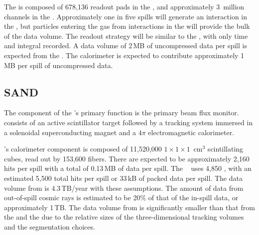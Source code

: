 \documentclass[../main-v1.tex]{subfiles}
\begin{document}
The  is composed of 678,136 readout pads in the , and approximately 3~million channels in the .  Approximately one in five spills will generate an interaction in the , but particles entering the gas from interactions in the  will provide the bulk of the data volume.  The readout strategy will be similar to the , with only time and integral recorded. A  data volume of 2\,MB of uncompressed data per spill is expected from the .  The calorimeter is expected to contribute approximately 1\,MB per spill of uncompressed data.


\subsection{SAND }
\label{sec:comp-dataestimates-sand}

The  component of the 's primary function is the primary beam flux monitor.    consists of an active scintillator target  followed by a tracking system immersed in a solenoidal superconducting magnet  and  a $4\pi$ electromagnetic calorimeter.

's  calorimeter component is composed of 11,520,000 $1\times 1\times 1$~cm$^3$ scintillating cubes, read out by 153,600 fibers.  There are expected to be approximately 2,160 hits per spill with a total of 0.13\,MB of data per spill.  The  ~\cite{Adinolfi:2002zx} uses 4,850 , with an estimated 5,500 total hits per spill or 33\,kB of packed data per spill.   The data volume from  is 4.3\,TB/year with these assumptions.  The amount of data from out-of-spill cosmic rays is estimated to be 20\% of that of the in-spill data, or approximately 1\,TB.  The data volume from  is significantly smaller than that from the  and the  due to the relative sizes of the three-dimensional tracking volumes and the segmentation choices.
\end{document}
